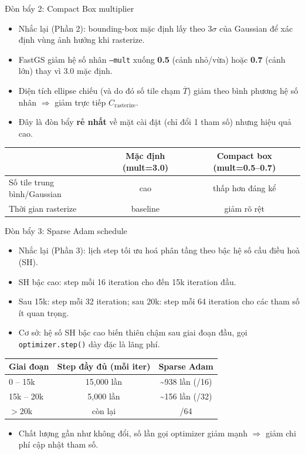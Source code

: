 \begin{frame}{Đòn bẩy 2: Compact Box multiplier}
\begin{itemize}
    \item Nhắc lại (Phần 2): bounding-box mặc định lấy theo $3\sigma$ của Gaussian để xác định vùng ảnh hưởng khi rasterize.
    \item FastGS giảm hệ số nhân \texttt{--mult} xuống \textbf{0.5} (cảnh nhỏ/vừa) hoặc \textbf{0.7} (cảnh lớn) thay vì 3.0 mặc định.
    \item Diện tích ellipse chiếu (và do đó số tile chạm $\overline{T}$) giảm theo bình phương hệ số nhân $\Rightarrow$ giảm trực tiếp $C_{\text{rasterize}}$.
    \item Đây là đòn bẩy \textbf{rẻ nhất} về mặt cài đặt (chỉ đổi 1 tham số) nhưng hiệu quả cao.
\end{itemize}
\vspace{0.2cm}
\centering
\footnotesize
\begin{tabular}{lcc}
\toprule
& \textbf{Mặc định (mult=3.0)} & \textbf{Compact box (mult=0.5--0.7)} \\
\midrule
Số tile trung bình/Gaussian & cao & thấp hơn đáng kể \\
Thời gian rasterize & baseline & giảm rõ rệt \\
\bottomrule
\end{tabular}
\end{frame}

\begin{frame}{Đòn bẩy 3: Sparse Adam schedule}
\begin{itemize}
    \item Nhắc lại (Phần 3): lịch step tối ưu hoá phân tầng theo bậc hệ số cầu điều hoà (SH).
    \item SH bậc cao: step mỗi 16 iteration cho đến 15k iteration đầu.
    \item Sau 15k: step mỗi 32 iteration; sau 20k: step mỗi 64 iteration cho các tham số ít quan trọng.
    \item Cơ sở: hệ số SH bậc cao biến thiên chậm sau giai đoạn đầu, gọi \texttt{optimizer.step()} dày đặc là lãng phí.
\end{itemize}
\vspace{0.2cm}
\centering
\footnotesize
\begin{tabular}{lcc}
\toprule
\textbf{Giai đoạn} & \textbf{Step đầy đủ (mỗi iter)} & \textbf{Sparse Adam} \\
\midrule
0 -- 15k & 15{,}000 lần & \textasciitilde 938 lần (/16) \\
15k -- 20k & 5{,}000 lần & \textasciitilde 156 lần (/32) \\
$>$20k & còn lại & /64 \\
\bottomrule
\end{tabular}
\begin{itemize}
    \item Chất lượng gần như không đổi, số lần gọi optimizer giảm mạnh $\Rightarrow$ giảm chi phí cập nhật tham số.
\end{itemize}
\end{frame}

